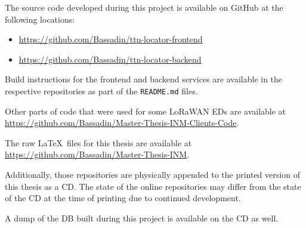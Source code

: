 
The source code developed during this project is available on GitHub at the following locations:

\begin{itemize}
    \item \url{https://github.com/Bassadin/ttn-locator-frontend}
    \item \url{https://github.com/Bassadin/ttn-locator-backend}
\end{itemize}

Build instructions for the frontend and backend services are available in the respective repositories as part of the \texttt{README.md} files.

Other parts of code that were used for some \ac{LoRaWAN} \aclp{ED} are available at \url{https://github.com/Bassadin/Master-Thesis-INM-Clients-Code}.

The raw \LaTeX~files for this thesis are available at \url{https://github.com/Bassadin/Master-Thesis-INM}.

Additionally, those repositories are physically appended to the printed version of this thesis as a CD\@.
The state of the online repositories may differ from the state of the CD at the time of printing due to continued development.

A dump of the \acl{DB} built during this project is available on the CD as well.